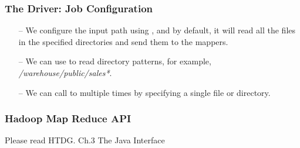 \begin{frame}[c]{ }
	\frametitle{The Driver:  Job Configuration}
	
	\begin{itemize}  [<+->]
		\item [--] We configure the input path using , and by default, it will read all the files in the specified directories and send them to the mappers.
		
		\item [--] We can use  to read directory patterns, for example, \textit{/warehouse/public/sales*}.
		\item [--] We can call  to multiple times by specifying a single file or directory. 
		
	\end{itemize}		
	
\end{frame}
\begin{frame}[c]{ }
	\frametitle{ Hadoop Map Reduce API}
	\centering     
	
	\textcolor{offgreen}{ \large Please read HTDG. Ch.3 The Java Interface}
\end{frame}


